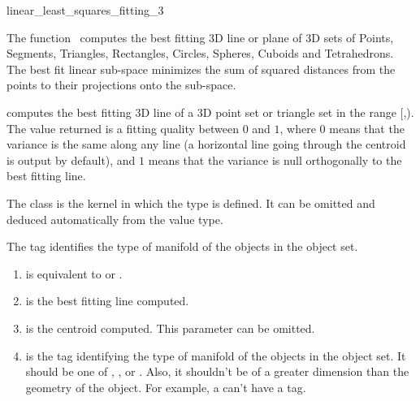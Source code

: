
\begin{ccRefFunction}{linear_least_squares_fitting_3}  

\ccDefinition
  
The function \ccRefName\ computes the best fitting 3D line or plane of 3D
sets of Points, Segments, Triangles, Rectangles, Circles, Spheres, Cuboids and Tetrahedrons. The best fit linear sub-space minimizes
the sum of squared distances from the points to their projections onto the
sub-space.


{ computes the best fitting 3D line of a 3D point set or triangle set in the range
[,). The value returned is a fitting quality
between $0$ and $1$, where $0$ means that the variance is the same
along any line (a horizontal line going through the centroid is output
by default), and $1$ means that the variance is null orthogonally
to the best fitting line. }

The class  is the kernel in which the type
 is defined. It can be omitted and
deduced automatically from the value type.

The tag  identifies the type of manifold of the objects in the object set.


\begin{enumerate}
   \item  {} is equivalent to  or .
   \item  {} is the best fitting line computed.
   \item  {} is the centroid computed. This parameter can be
          omitted.
   \item  {} is the tag identifying the type of manifold of the objects in the object set. It should be one of , ,  or . Also, it shouldn't be of a greater dimension than the geometry of the object. For example, a  can't have a  tag.
\end{enumerate}



\end{ccRefFunction}
